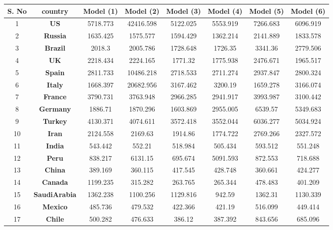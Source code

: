 \begin{table*}
\begin{center}
\begin{tiny}
\begin{tabular}{|c|c|c|c|c|c|c|c|} \hline
\bf{S. No} & \bf{country} & \bf{Model (1)} & \bf{Model (2)} & \bf{Model (3)} & \bf{Model (4)} & \bf{Model (5)} & \bf{Model (6)}\\ \hline
1 & {\bf US} & 5718.773 & 42416.598 & 5122.025 & 5553.919 & 7266.683 & 6096.919\\ \hline
2 & {\bf Russia} & 1635.425 & 1575.577 & 1594.429 & 1362.214 & 2141.889 & 1833.578\\ \hline
3 & {\bf Brazil} & 2018.3 & 2005.786 & 1728.648 & 1726.35 & 3341.36 & 2779.506\\ \hline
4 & {\bf UK} & 2218.434 & 2224.165 & 1771.32 & 1775.938 & 2476.671 & 1965.517\\ \hline
5 & {\bf Spain} & 2811.733 & 10486.218 & 2718.533 & 2711.274 & 2937.847 & 2800.324\\ \hline
6 & {\bf Italy} & 1668.397 & 20682.956 & 3167.462 & 3200.19 & 1659.278 & 3166.074\\ \hline
7 & {\bf France} & 3790.731 & 3763.948 & 2966.285 & 2941.917 & 3993.987 & 3100.442\\ \hline
8 & {\bf Germany} & 1886.71 & 1870.296 & 1603.869 & 2955.005 & 6539.57 & 5349.683\\ \hline
9 & {\bf Turkey} & 4130.371 & 4074.611 & 3572.418 & 3552.044 & 6036.277 & 5034.924\\ \hline
10 & {\bf Iran} & 2124.558 & 2169.63 & 1914.86 & 1774.722 & 2769.266 & 2327.572\\ \hline
11 & {\bf India} & 543.442 & 552.21 & 518.984 & 505.434 & 593.512 & 551.248\\ \hline
12 & {\bf Peru} & 838.217 & 6131.15 & 695.674 & 5091.593 & 872.553 & 718.688\\ \hline
13 & {\bf China} & 389.169 & 360.115 & 417.545 & 428.748 & 360.661 & 424.277\\ \hline
14 & {\bf Canada} & 1199.235 & 315.282 & 263.765 & 265.344 & 478.483 & 401.209\\ \hline
15 & {\bf SaudiArabia} & 1362.238 & 1100.256 & 1129.816 & 942.59 & 1362.31 & 1130.339\\ \hline
16 & {\bf Mexico} & 485.736 & 479.532 & 422.366 & 421.19 & 516.099 & 449.414\\ \hline
17 & {\bf Chile} & 500.282 & 476.633 & 386.12 & 387.392 & 843.656 & 685.096\\ \hline

\end{tabular}
\end{tiny}
\end{center}
\end{table*}
